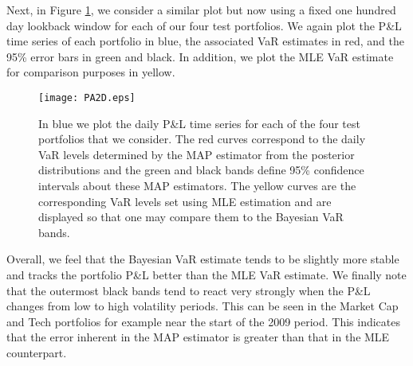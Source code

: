 \documentclass{amsart}
\begin{document}
Next, in Figure \ref{perform2}, we consider a similar plot but now using a fixed one hundred day 
lookback window for each of our four test portfolios.  We again plot the P\&L time series of 
each portfolio in blue, the associated VaR estimates in red, and the 95\% error bars in green and 
black.  In addition, we plot the MLE VaR estimate for comparison purposes in yellow. 
%
\begin{figure}[h!]
    \centering
    \texttt{[image: PA2D.eps]}
    \caption{In blue we plot the daily P\&L time series for each of the four test portfolios that 
     we consider.  The red curves correspond to the daily VaR levels determined by the MAP 
     estimator from the posterior distributions and the green and black bands define 95\% 
     confidence intervals about these MAP estimators.  The yellow curves are the corresponding 
     VaR levels set using MLE estimation and are displayed so that one may compare them to the 
     Bayesian VaR bands.}
    \label{perform2}
\end{figure}
%
Overall, we feel that the Bayesian VaR estimate tends to be slightly more stable and  
tracks the portfolio P\&L better than the MLE VaR estimate.  We finally note that the outermost black 
bands tend to react very strongly when the P\&L changes from low to high volatility periods. 
This can be seen in the Market Cap and Tech portfolios for example near the start of the 2009 
period.  This indicates that the error inherent in the MAP estimator is greater than that 
in the MLE counterpart. 
\end{document}

